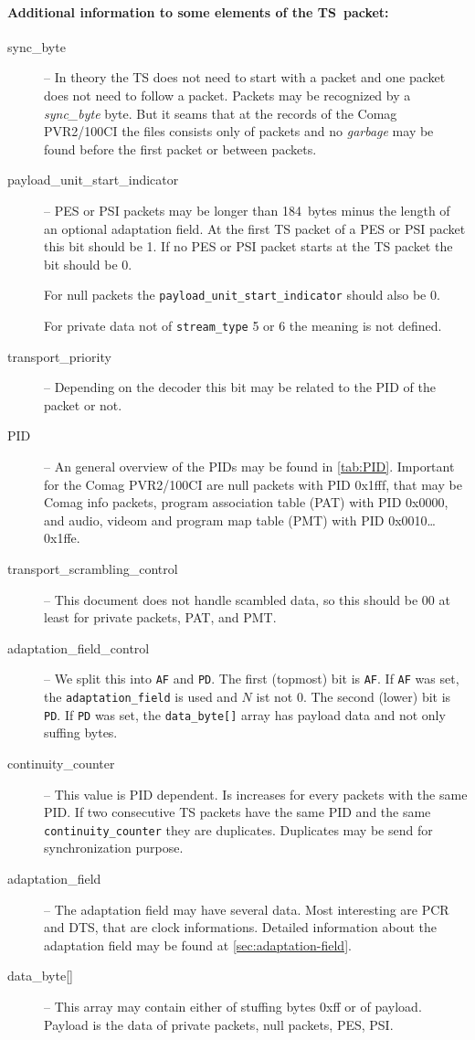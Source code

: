 \documentclass{scrartcl}
\newcommand*{\Comag}{Comag PVR2/100CI\xspace}
\begin{document}
\paragraph{Additional information to some elements of the TS~packet:}
\begin{description}
\item[sync\_byte] -- In theory the TS does not need to start with a packet and
  one packet does not need to follow a packet. Packets may be recognized by a
  \emph{sync\_byte} byte. But it seams that at the records of the \Comag the
  files consists only of packets and no \emph{garbage} may be found before the
  first packet or between packets.
\item[payload\_unit\_start\_indicator] -- PES or PSI packets may be longer
  than 184~bytes minus the length of an optional adaptation field. At the
  first TS packet of a PES or PSI packet this bit should be 1. If no PES or
  PSI packet starts at the TS packet the bit should be 0.

  For null packets the \texttt{payload\_unit\_start\_indicator} should also be
  0.

  For private data not of \texttt{stream\_type} 5 or 6 the meaning is not
  defined.
\item[transport\_priority] -- Depending on the decoder this bit may be related
  to the PID of the packet or not.
\item[PID] -- An general overview of the PIDs may be found in
  \autoref{tab:PID}. Important for the \Comag are null packets with PID
  0x1fff, that may be Comag info packets, program association table (PAT) with
  PID 0x0000, and audio, videom and program map table (PMT) with PID
  0x0010\dots 0x1ffe.
\item[transport\_scrambling\_control] -- This document does not handle
  scambled data, so this should be 00 at least for private packets, PAT, and
  PMT.
\item[adaptation\_field\_control] -- We split this into \texttt{AF} and
  \texttt{PD}. The first (topmost) bit is \texttt{AF}. If \texttt{AF} was set,
  the \texttt{adaptation\_field} is used and $N$ ist not 0. The second (lower)
  bit is \texttt{PD}. If \texttt{PD} was set, the \texttt{data\_byte[]} array
  has payload data and not only suffing bytes.
\item[continuity\_counter] -- This value is PID dependent. Is increases for
  every packets with the same PID. If two consecutive TS packets have the same
  PID and the same \texttt{continuity\_counter} they are
  duplicates. Duplicates may be send for synchronization purpose.
\item[adaptation\_field] -- The adaptation field may have several data. Most
  interesting are PCR and DTS, that are clock informations. Detailed
  information about the adaptation field may be found at
  \autoref{sec:adaptation-field}.
\item[{data\_byte[]}] -- This array may contain either of stuffing bytes 0xff or
  of payload. Payload is the data of private packets, null packets, PES, PSI.
\end{description}
\end{document}

